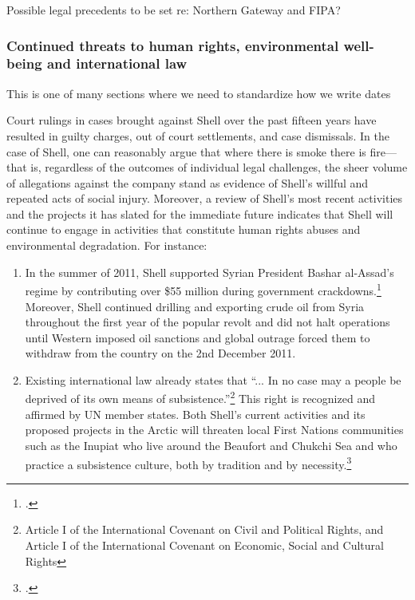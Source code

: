 \begin{vcom}
Possible legal precedents to be set re: Northern Gateway and FIPA?
\end{vcom}


	\subsubsection{Continued threats to human rights, environmental well-being and international law}
	
\begin{vcom}
This is one of many sections where we need to standardize how we write dates
\end{vcom}
	
Court rulings in cases brought against Shell over the past fifteen years have resulted in guilty charges, out of court settlements, and case dismissals. 
In the case of Shell, one can reasonably argue that where there is smoke there is fire—that is, regardless of the outcomes of individual legal challenges, the sheer volume of allegations against the company stand as evidence of Shell's willful and repeated acts of social injury. 
Moreover, a review of Shell's most recent activities and the projects it has slated for the immediate future indicates that Shell will continue to engage in activities that constitute human rights abuses and environmental degradation.
For instance:
\begin{enumerate}
	\item In the summer of 2011, Shell supported Syrian President Bashar al-Assad's regime by contributing over \$55 million during government crackdowns.\footcite[][]{Syria_2011} Moreover, Shell continued drilling and exporting crude oil from Syria throughout the first year of the popular revolt and did not halt operations until Western imposed oil sanctions and global outrage forced them to withdraw from the country on the 2nd December 2011.
	\item Existing international law already states that ``... In no case may a people be deprived of its own means of subsistence.''\footnote{Article I of the International Covenant on Civil and Political Rights, and Article I of the International Covenant on Economic, Social and Cultural Rights} This right is recognized and affirmed by UN member states. Both Shell's current activities and its proposed projects in the Arctic will threaten local First Nations communities such as the Inupiat who live around the Beaufort and Chukchi Sea and who practice a subsistence culture, both by tradition and by necessity.\footcite[][p. 13]{RiskingRuin_2012}
\end{enumerate}


